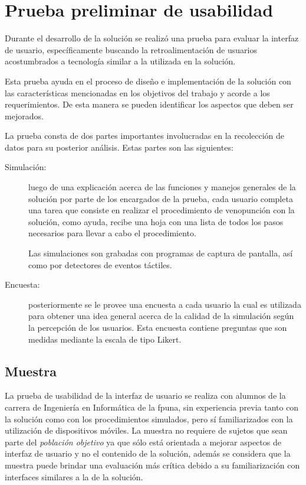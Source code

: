 
\section{Prueba preliminar de usabilidad}
\label{sec:interfaz}

Durante el desarrollo de la solución se realizó una prueba para evaluar la 
interfaz de usuario, específicamente buscando la retroalimentación de usuarios 
acostumbrados a tecnología similar a la utilizada en la solución.

Esta prueba ayuda en el proceso de diseño e implementación de la solución con 
las características mencionadas en los objetivos del trabajo y acorde a los 
requerimientos. De esta manera se pueden identificar los aspectos que deben 
ser mejorados.

La prueba consta de dos partes importantes involucradas en la recolección
de datos para su posterior análisis. Estas partes son las siguientes:

\begin{description}

\item[Simulación:] luego de una explicación acerca de las funciones y manejos
    generales de la solución por parte de los encargados de la prueba, cada usuario
    completa una tarea que consiste en realizar el procedimiento de venopunción con la 
    solución, como ayuda, recibe una hoja con una lista de todos los pasos 
    necesarios para llevar a cabo el procedimiento.
    	
    Las simulaciones son grabadas con programas de captura de pantalla, así
    como por detectores de eventos táctiles.
    	
\item[Encuesta:] posteriormente se le provee una encuesta a cada
    usuario la cual es utilizada para obtener una idea general acerca de la
    calidad de la simulación según la percepción de los usuarios. Esta encuesta 
    contiene preguntas que son medidas mediante la escala de tipo Likert. 

\end{description} 

\subsection{Muestra}

La prueba de usabilidad de la interfaz de usuario se realiza con alumnos de la carrera de
Ingeniería en Informática de la \Gls{fpuna}, sin experiencia previa tanto con la
solución como con los procedimientos simulados, pero sí familiarizados con la
utilización de dispositivos móviles. La muestra no requiere de sujetos que sean
parte del \emph{población objetivo} ya que sólo está
orientada a mejorar aspectos de interfaz de usuario y no el contenido de la
solución, además se considera que la muestra puede brindar una evaluación más
crítica debido a su familiarización con interfaces similares a la de la
solución.

